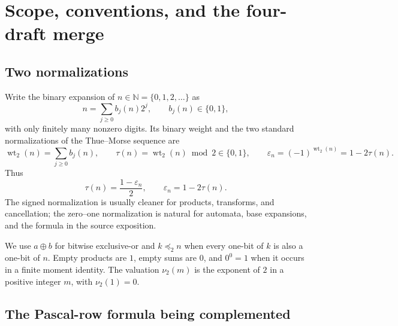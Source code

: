 \documentclass[11pt,oneside]{article}
\numberwithin{equation}{section}
\theoremstyle{definition}
\theoremstyle{remark}
\newcommand{\N}{\mathbb N}
\newcommand{\wt}{\operatorname{wt}_2}
\newcommand{\vtwo}{\nu_2}
\newcommand{\eps}{\varepsilon}
\newcommand{\xor}{\mathbin{\oplus}}
\newcommand{\submask}{\mathrel{\preccurlyeq_2}}
\begin{document}
\begin{abstract}
Every elementary assertion is proved in the text; deeper historical results
about transcendence, substitution spectra, and evaluated products are clearly
identified and cited.  No mathematical priority is claimed for identities
merely derived here, and no formula is silently represented as already
formalized in Lean.
\end{abstract}


\newpage

\section[Four-draft merge]{Scope, conventions, and the four-draft merge}
\label{p1:sec:scope}

\subsection{Two normalizations}

Write the binary expansion of \(n\in\N=\{0,1,2,\ldots\}\) as
\begin{equation}
  n=\sum_{j\ge0}b_j(n)2^j,
  \qquad b_j(n)\in\{0,1\},
  \label{p1:eq:binary-expansion}
\end{equation}
with only finitely many nonzero digits.  Its binary weight and the two standard
normalizations of the Thue--Morse sequence are
\begin{equation}
  \wt(n)=\sum_{j\ge0}b_j(n),
  \qquad
  \tau(n)=\wt(n)\bmod2\in\{0,1\},
  \qquad
  \eps_n=(-1)^{\wt(n)}=1-2\tau(n).
  \label{p1:eq:normalizations}
\end{equation}
Thus
\begin{equation}
  \tau(n)=\frac{1-\eps_n}{2},
  \qquad
  \eps_n=1-2\tau(n).
  \label{p1:eq:normalization-bridge}
\end{equation}
The signed normalization is usually cleaner for products, transforms, and
cancellation; the zero--one normalization is natural for automata, base
expansions, and the formula in the source exposition.

We use \(a\xor b\) for bitwise exclusive-or and \(k\submask n\) when every
one-bit of \(k\) is also a one-bit of \(n\).  Empty products are \(1\), empty
sums are \(0\), and \(0^0=1\) when it occurs in a finite moment identity.
The valuation \(\vtwo(m)\) is the exponent of \(2\) in a positive integer
\(m\), with \(\vtwo(1)=0\).

\subsection{The Pascal-row formula being complemented}
\end{document}
